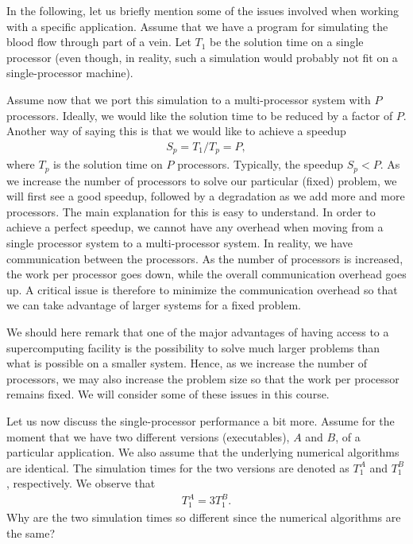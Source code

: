 In the following, let us briefly mention some of the issues involved when
working with a specific application. Assume that we have a program for
simulating the blood flow through part of a vein. Let $T_1$ be the solution time
on a single processor (even though, in reality, such a simulation would probably
not fit on a single-processor machine).

Assume now that we port this simulation to a multi-processor system with $P$
processors. Ideally, we would like the solution time to be reduced by a factor
of $P$. Another way of saying this is that we would like to achieve a speedup
\begin{align}
  S_p=T_1/T_p = P,
\end{align}
where $T_p$ is the solution time on $P$ processors. Typically, the speedup $S_p
< P$. As we increase the number of processors to solve our particular (fixed)
problem, we will first see a good speedup, followed by a degradation as we add
more and more processors. The main explanation for this is easy to understand.
In order to achieve a perfect speedup, we cannot have any overhead when moving
from a single processor system to a multi-processor system. In reality, we have
communication between the processors. As the number of processors is increased,
the work per processor goes down, while the overall communication overhead goes
up. A critical issue is therefore to minimize the communication overhead so that
we can take advantage of larger systems for a fixed problem.

We should here remark that one of the major advantages of having access to a
supercomputing facility is the possibility to solve much larger problems than
what is possible on a smaller system. Hence, as we increase the number of
processors, we may also increase the problem size so that the work per processor
remains fixed. We will consider some of these issues in this course.

Let us now discuss the single-processor performance a bit more. Assume for the
moment that we have two different versions (executables), $A$ and $B$, of a
particular application. We also assume that the underlying numerical algorithms
are identical. The simulation times for the two versions are denoted as $T_1^A$
and $T_1^B$, respectively. We observe that
\begin{align}
  T_1^A = 3 T_1^B.
\end{align}
Why are the two simulation times so different since the numerical algorithms are
the same?

